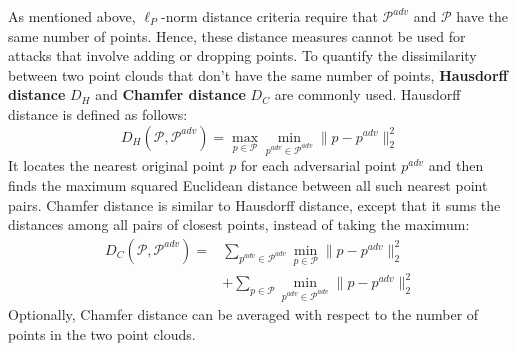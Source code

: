 \documentclass{ieeeaccess}
\begin{document}
As mentioned above, $\ell_P$-norm distance criteria require that $\mathcal{P}^{adv}$ and $\mathcal{P}$ have the same number of points. Hence, these distance measures cannot be %
used for attacks
that involve adding or dropping points. To quantify the dissimilarity between two point clouds that don't have the same number of points, \textbf{Hausdorff distance} $D_H$ and \textbf{Chamfer distance} $D_C$ are commonly used. %
Hausdorff distance is defined as follows: %
\begin{equation}
D_{H} (\mathcal{P} , \mathcal{P}^{adv}) = \max\limits_{p \in \mathcal{P}} \min\limits_{p^{adv} \in \mathcal{P}^{adv}} \|p - p^{adv}\|_2^2
\label{eq:2}
\end{equation}
It locates the nearest original point $p$ for each adversarial point $p^{adv}$ and then finds the maximum squared Euclidean distance between all such nearest point pairs. Chamfer distance is similar to Hausdorff distance, except that it %
sums the distances among all pairs of closest points, instead of taking the maximum:
\begin{equation}
\begin{split}
D_{C} (\mathcal{P} , \mathcal{P}^{adv}) =& \sum_{p^{adv} \in \mathcal{P}^{adv}} \min\limits_{p \in \mathcal{P}}\|p - p^{adv}\|_2^2 \\
& + \sum_{p \in \mathcal{P}} \min\limits_{p^{adv} \in \mathcal{P}^{adv}}\|p - p^{adv}\|_2^2    
\end{split}
\label{eq:3}
\end{equation}
Optionally, Chamfer distance can be averaged with respect to the number of points in the two point clouds. 
\end{document}

